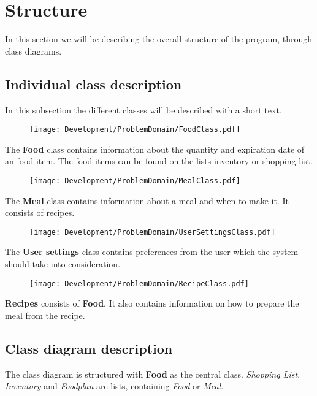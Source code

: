 \section{Structure}
In this section we will be describing the overall structure of the program, through class diagrams.

\subsection{Individual class description}
In this subsection the different classes will be described with a short text.

\begin{figure}[H]
	\centering
	\texttt{[image: Development/ProblemDomain/FoodClass.pdf]}
	\label{FoodClass}
\end{figure}
The \textbf{Food} class contains information about the quantity and expiration date of an food item. The food items can be found on the lists inventory or shopping list.

\begin{figure}[H]
	\centering
	\texttt{[image: Development/ProblemDomain/MealClass.pdf]}
	\label{MealClass}
\end{figure}
The \textbf{Meal} class contains information about a meal and when to make it. It consists of recipes.

\begin{figure}[H]
	\centering
	\texttt{[image: Development/ProblemDomain/UserSettingsClass.pdf]}
	\label{UserSettingsClass}
\end{figure}
The \textbf{User settings} class contains preferences from the user which the system should take into consideration.

\begin{figure}[H]
	\centering
	\texttt{[image: Development/ProblemDomain/RecipeClass.pdf]}
	\label{RecipeClass}
	\end{figure}
\textbf{Recipes} consists of \textbf{Food}. It also contains information on how to prepare the meal from the recipe.

\subsection{Class diagram description}
The class diagram is structured with \textbf{Food} as the central class. 
\textit{Shopping List}, \textit{Inventory} and \textit{Foodplan} are lists, containing \textit{Food} or \textit{Meal}.

